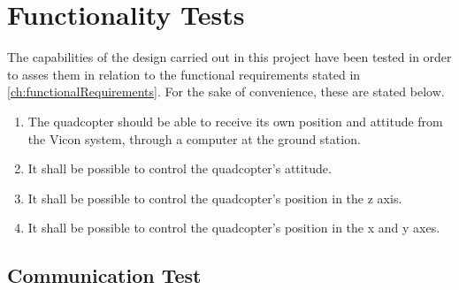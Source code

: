 \chapter{Functionality Tests}
The capabilities of the design carried out in this project have been tested in order to asses them in relation to the functional requirements stated in \autoref{ch:functionalRequirements}. 
For the sake of convenience, these are stated below.
\begin{enumerate}[label=\textbf{\arabic*})]
\item {The quadcopter should be able to receive its own position and attitude from the Vicon system, through a computer at the ground station.}
\item {It shall be possible to control the quadcopter's attitude.}
\item {It shall be possible to control the quadcopter's position in the z axis.}
\item {It shall be possible to control the quadcopter's position in the x and y axes.}
\end{enumerate}


\section{Communication Test}\label{sec:NetworkTest}



